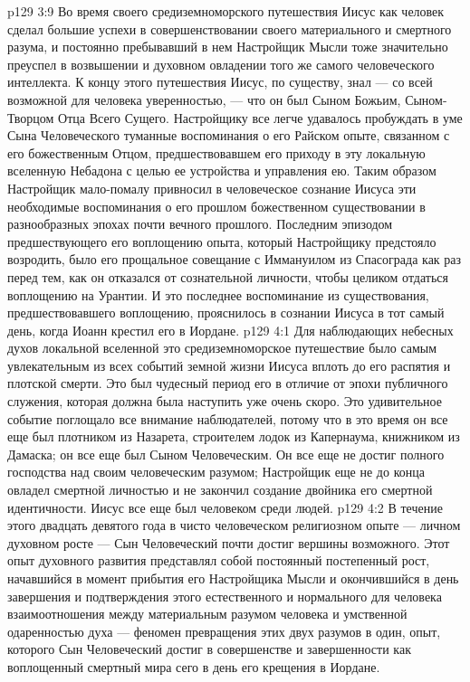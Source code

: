 \vs p129 3:9 Во время своего средиземноморского путешествия Иисус как человек сделал большие успехи в совершенствовании своего материального и смертного разума, и постоянно пребывавший в нем Настройщик Мысли тоже значительно преуспел в возвышении и духовном овладении того же самого человеческого интеллекта. К концу этого путешествия Иисус, по существу, знал --- со всей возможной для человека уверенностью, --- что он был Сыном Божьим, Сыном\hyp{}Творцом Отца Всего Сущего. Настройщику все легче удавалось пробуждать в уме Сына Человеческого туманные воспоминания о его Райском опыте, связанном с его божественным Отцом, предшествовавшем его приходу в эту локальную вселенную Небадона с целью ее устройства и управления ею. Таким образом Настройщик мало\hyp{}помалу привносил в человеческое сознание Иисуса эти необходимые воспоминания о его прошлом божественном существовании в разнообразных эпохах почти вечного прошлого. Последним эпизодом предшествующего его воплощению опыта, который Настройщику предстояло возродить, было его прощальное совещание с Иммануилом из Спасограда как раз перед тем, как он отказался от сознательной личности, чтобы целиком отдаться воплощению на Урантии. И это последнее воспоминание из существования, предшествовавшего воплощению, прояснилось в сознании Иисуса в тот самый день, когда Иоанн крестил его в Иордане.
\vs p129 4:1 Для наблюдающих небесных духов локальной вселенной это средиземноморское путешествие было самым увлекательным из всех событий земной жизни Иисуса вплоть до его распятия и плотской смерти. Это был чудесный период его  в отличие от эпохи публичного служения, которая должна была наступить уже очень скоро. Это удивительное событие поглощало все внимание наблюдателей, потому что в это время он все еще был плотником из Назарета, строителем лодок из Капернаума, книжником из Дамаска; он все еще был Сыном Человеческим. Он все еще не достиг полного господства над своим человеческим разумом; Настройщик еще не до конца овладел смертной личностью и не закончил создание двойника его смертной идентичности. Иисус все еще был человеком среди людей.
\vs p129 4:2 В течение этого двадцать девятого года в чисто человеческом религиозном опыте --- личном духовном росте --- Сын Человеческий почти достиг вершины возможного. Этот опыт духовного развития представлял собой постоянный постепенный рост, начавшийся в момент прибытия его Настройщика Мысли и окончившийся в день завершения и подтверждения этого естественного и нормального для человека взаимоотношения между материальным разумом человека и умственной одаренностью духа --- феномен превращения этих двух разумов в один, опыт, которого Сын Человеческий достиг в совершенстве и завершенности как воплощенный смертный мира сего в день его крещения в Иордане.
